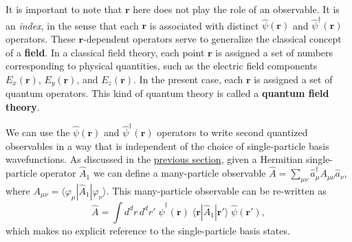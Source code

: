 \documentclass[pra,12pt]{revtex4}
\begin{document}
It is important to note that $\mathbf{r}$ here does not play the role
of an observable.  It is an \textit{index}, in the sense that each
$\mathbf{r}$ is associated with distinct $\hat{\psi}(\mathbf{r})$ and
$\hat{\psi}^\dagger(\mathbf{r})$ operators.  These
$\mathbf{r}$-dependent operators serve to generalize the classical
concept of a \textbf{field}.  In a classical field theory, each point
$\mathbf{r}$ is assigned a set of numbers corresponding to physical
quantities, such as the electric field components $E_x(\mathbf{r})$,
$E_y(\mathbf{r})$, and $E_z(\mathbf{r})$.  In the present case, each
$\mathbf{r}$ is assigned a set of quantum operators.  This kind of
quantum theory is called a \textbf{quantum field theory}.

We can use the $\hat{\psi}(\mathbf{r})$ and
$\hat{\psi}^\dagger(\mathbf{r})$ operators to write second quantized
observables in a way that is independent of the choice of
single-particle basis wavefunctions.  As discussed in the
\hyperref[sec:second_quant_op]{previous section}, given a Hermitian
single-particle operator $\hat{A}_1$ we can define a many-particle
observable $\hat{A} = \sum_{\mu\nu} \hat{a}^\dagger_\mu A_{\mu\nu}
\hat{a}_\nu$, where $A_{\mu\nu} =
\langle\varphi_\mu|\hat{A}_1|\varphi_\nu\rangle$.  This many-particle
observable can be re-written as
\begin{equation}
  \hat{A} = \int d^dr \,d^dr' \;\hat{\psi}^\dagger(\mathbf{r})
  \;\langle \mathbf{r}|\hat{A}_1|\mathbf{r}'\rangle \; \hat{\psi}(\mathbf{r}'),
\end{equation}
which makes no explicit reference to the single-particle basis states.
\end{document}
